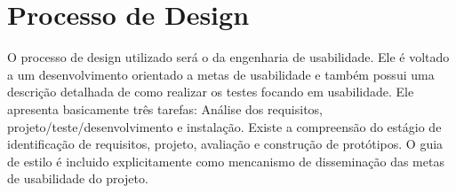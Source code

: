 \chapter[Processo de Design]{Processo de Design}

O processo de design utilizado será o da engenharia de usabilidade. Ele é voltado a um desenvolvimento orientado a metas de usabilidade e também possui uma descrição detalhada de como realizar os testes focando em usabilidade. Ele apresenta basicamente três tarefas: Análise dos requisitos, projeto/teste/desenvolvimento e instalação. Existe a compreensão do estágio de identificação de requisitos, projeto, avaliação e construção de protótipos. O guia de estilo é incluido explicitamente como mencanismo de disseminação das metas de usabilidade do projeto.
